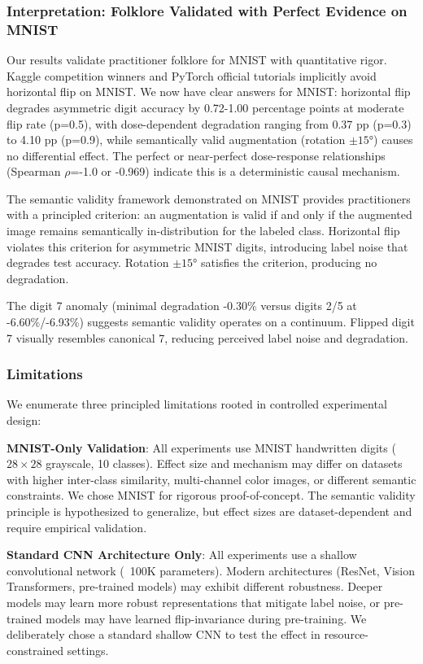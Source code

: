 
\subsubsection{Interpretation: Folklore Validated with Perfect Evidence on MNIST}

Our results validate practitioner folklore for MNIST with quantitative rigor. Kaggle competition winners and PyTorch official tutorials implicitly avoid horizontal flip on MNIST. We now have clear answers for MNIST: horizontal flip degrades asymmetric digit accuracy by 0.72-1.00 percentage points at moderate flip rate (p=0.5), with dose-dependent degradation ranging from 0.37 pp (p=0.3) to 4.10 pp (p=0.9), while semantically valid augmentation (rotation $\pm 15$°) causes no differential effect. The perfect or near-perfect dose-response relationships (Spearman $\rho$=-1.0 or -0.969) indicate this is a deterministic causal mechanism.

The semantic validity framework demonstrated on MNIST provides practitioners with a principled criterion: an augmentation is valid if and only if the augmented image remains semantically in-distribution for the labeled class. Horizontal flip violates this criterion for asymmetric MNIST digits, introducing label noise that degrades test accuracy. Rotation $\pm 15$° satisfies the criterion, producing no degradation.

The digit 7 anomaly (minimal degradation -0.30\% versus digits 2/5 at -6.60\%/-6.93\%) suggests semantic validity operates on a continuum. Flipped digit 7 visually resembles canonical 7, reducing perceived label noise and degradation.

\subsubsection{Limitations}

We enumerate three principled limitations rooted in controlled experimental design:

\textbf{MNIST-Only Validation}: All experiments use MNIST handwritten digits ($28\times 28$ grayscale, 10 classes). Effect size and mechanism may differ on datasets with higher inter-class similarity, multi-channel color images, or different semantic constraints. We chose MNIST for rigorous proof-of-concept. The semantic validity principle is hypothesized to generalize, but effect sizes are dataset-dependent and require empirical validation.

\textbf{Standard CNN Architecture Only}: All experiments use a shallow convolutional network (~100K parameters). Modern architectures (ResNet, Vision Transformers, pre-trained models) may exhibit different robustness. Deeper models may learn more robust representations that mitigate label noise, or pre-trained models may have learned flip-invariance during pre-training. We deliberately chose a standard shallow CNN to test the effect in resource-constrained settings.


